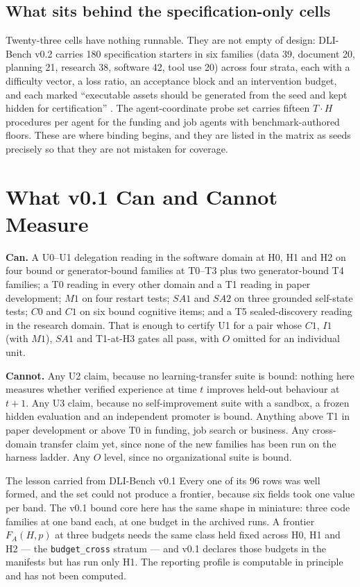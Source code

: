 \documentclass[11pt]{article}
\theoremstyle{definition}
\begin{document}
\subsection{What sits behind the specification-only cells}

Twenty-three cells have nothing runnable. They are not empty of design: DLI-Bench v0.2 carries 180 specification starters in six families (data 39, document 20, planning 21, research 38, software 42, tool use 20) across four strata, each with a difficulty vector, a loss ratio, an acceptance block and an intervention budget, and each marked ``executable assets should be generated from the seed and kept hidden for certification'' \citep{yang2026dlibench}. The agent-coordinate probe set carries fifteen $T{\cdot}H$ procedures per agent for the funding and job agents with benchmark-authored floors. These are where binding begins, and they are listed in the matrix as seeds precisely so that they are not mistaken for coverage.

\section{What v0.1 Can and Cannot Measure}\label{sec:can}

\textbf{Can.} A U0--U1 delegation reading in the software domain at H0, H1 and H2 on four bound or generator-bound families at T0--T3 plus two generator-bound T4 families; a T0 reading in every other domain and a T1 reading in paper development; $M1$ on four restart tests; $SA1$ and $SA2$ on three grounded self-state tests; $C0$ and $C1$ on six bound cognitive items; and a T5 sealed-discovery reading in the research domain. That is enough to certify U1 for a pair whose $C1$, $I1$ (with $M1$), $SA1$ and T1-at-H3 gates all pass, with $O$ omitted for an individual unit.

\textbf{Cannot.} Any U2 claim, because no learning-transfer suite is bound: nothing here measures whether verified experience at time $t$ improves held-out behaviour at $t+1$. Any U3 claim, because no self-improvement suite with a sandbox, a frozen hidden evaluation and an independent promoter is bound. Anything above T1 in paper development or above T0 in funding, job search or business. Any cross-domain transfer claim yet, since none of the new families has been run on the harness ladder. Any $O$ level, since no organizational suite is bound.

\begin{cautionbox}{The lesson carried from DLI-Bench v0.1}
Every one of its 96 rows was well formed, and the set could not produce a frontier, because six fields took one value per band. The v0.1 bound core here has the same shape in miniature: three code families at one band each, at one budget in the archived runs. A frontier $F_A(H,p)$ at three budgets needs the same class held fixed across H0, H1 and H2 --- the \texttt{budget\_cross} stratum --- and v0.1 declares those budgets in the manifests but has run only H1. The reporting profile is computable in principle and has not been computed.
\end{cautionbox}
\end{document}
